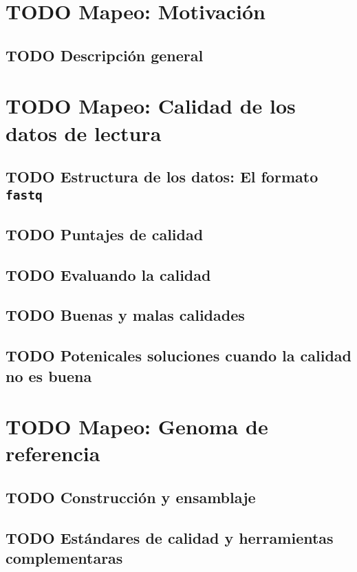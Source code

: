 \documentclass[11pt]{article}
\author{Juan Enciso}
\date{\today}
\title{}
\begin{document}
\tableofcontents

\section{{\bfseries\sffamily TODO} Mapeo: Motivación}
\label{sec:org8c18e96}
\subsection{{\bfseries\sffamily TODO} Descripción general}
\label{sec:orge863e66}
\section{{\bfseries\sffamily TODO} Mapeo: Calidad de los datos de lectura}
\label{sec:orga96eca5}
\subsection{{\bfseries\sffamily TODO} Estructura de los datos: El formato \texttt{fastq}}
\label{sec:org1ea4325}
\subsection{{\bfseries\sffamily TODO} Puntajes de calidad}
\label{sec:orgf36f0e5}
\subsection{{\bfseries\sffamily TODO} Evaluando la calidad}
\label{sec:orge3d103f}
\subsection{{\bfseries\sffamily TODO} Buenas y malas calidades}
\label{sec:orgbaf65e0}
\subsection{{\bfseries\sffamily TODO} Potenicales soluciones cuando la calidad no es buena}
\label{sec:org4a4fc45}
\section{{\bfseries\sffamily TODO} Mapeo: Genoma de referencia}
\label{sec:orgcc0fe13}
\subsection{{\bfseries\sffamily TODO} Construcción y ensamblaje}
\label{sec:org79bfa97}
\subsection{{\bfseries\sffamily TODO} Estándares de calidad y herramientas complementaras}
\label{sec:orgc4e4f54}
\end{document}
